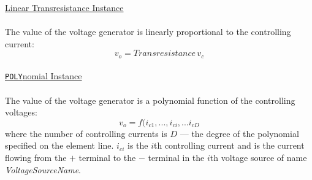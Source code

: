 \noindent\underline{Linear Transresistance Instance}
\\[0.1in]\hspace*{\fill}\\[0.1in]
The value of the voltage generator is linearly proportional to the controlling
current:
\begin{equation}
v_o = Transresistance\,v_c
\end{equation}
\\[0.2in]\noindent\underline{{\tt POLY}nomial Instance}
\\[0.1in]\hspace*{\fill}\\[0.1in]
The value of the voltage generator is a polynomial function of the controlling
voltages:
\begin{equation}
v_o = f(i_{c1}, ...,  i_{ci}, ...  i_{cD}
\end{equation}
where the number of controlling currents is $D$ --- the degree of the polynomial
specified on the element line.
$i_{ci}$ is the $i$th controlling current and is the current flowing from the
$+$ terminal to the $-$ terminal in the
$i$th voltage source of name {\it VoltageSourceName}.
